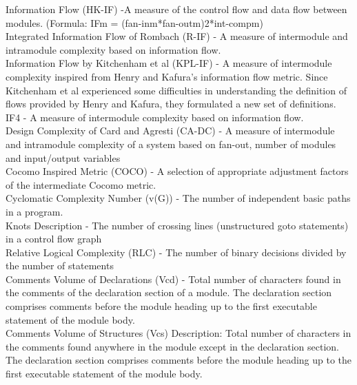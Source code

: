 \documentclass{article}
\begin{document}
Information Flow (HK-IF) -A measure of the control flow and data flow between modules. (Formula: IFm = (fan-inm*fan-outm)2*int-compm)\\

Integrated Information Flow of Rombach (R-IF) - A  measure  of  intermodule  and  intramodule  complexity  based  on  information  flow. \\

 Information Flow by Kitchenham et al (KPL-IF) - A   measure   of   intermodule   complexity   inspired   from   Henry   and   Kafura's   information flow metric.  Since Kitchenham et al experienced some difficulties in understanding   the   definition   of   flows   provided   by   Henry   and   Kafura,   they   formulated a new set of definitions.\\
 
  IF4 -  A measure of intermodule complexity based on information flow.\\

Design Complexity of Card and Agresti (CA-DC) - A  measure  of  intermodule  and  intramodule  complexity  of  a  system  based  on  fan-out, number of modules and input/output variables \\

Cocomo Inspired Metric (COCO) - A selection of appropriate adjustment factors of the intermediate Cocomo metric. \\

Cyclomatic Complexity Number (v(G)) -   The number of independent basic paths in a program. \\

Knots Description -  The  number  of  crossing  lines  (unstructured  goto  statements)  in  a  control  flow  graph\\

Relative Logical Complexity (RLC) -  The number of binary decisions divided by the number of statements \\

Comments Volume of Declarations (Vcd) -  Total number of characters found in the comments of the declaration section of a module.  The declaration section comprises comments before the module heading up to the first executable statement of the module body. \\

 Comments Volume of Structures (Vcs) Description:    Total number of characters in the comments found anywhere in the module except in  the  declaration  section.    The  declaration  section  comprises  comments  before  the module heading up to the first executable statement of the module body.\\
 
\end{document}
